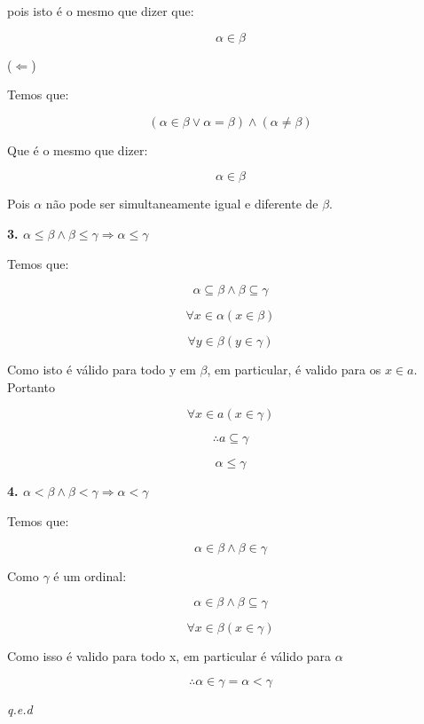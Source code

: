 \documentclass[12pt]{extarticle}
\newcommand{\fim}{\begin{flushright}

   \emph{q.e.d}
\end{flushright}}
\begin{document}
pois isto é o mesmo que dizer que:

$$
\alpha \in \beta
$$

($\Leftarrow$)

Temos que:

$$
(\alpha \in \beta \lor \alpha = \beta) \land (\alpha \neq \beta)
$$

Que é o mesmo que dizer:

$$
\alpha \in \beta
$$

Pois $\alpha$ não pode ser simultaneamente igual e diferente de $\beta$.

\textbf{3. $\alpha \leq \beta \land \beta \leq \gamma \Rightarrow \alpha \leq \gamma$}

Temos que:

$$
\alpha \subseteq \beta \land \beta \subseteq \gamma
$$

$$
\forall x \in \alpha (x \in \beta)
$$

$$
\forall y \in \beta (y \in \gamma)
$$

Como isto é válido para todo y em $\beta$, em particular, é valido para os $x \in a$. Portanto

$$
\forall x \in a (x \in \gamma)
$$

$$
\therefore a \subseteq \gamma
$$

$$
\alpha \leq \gamma
$$

\textbf{4. $\alpha < \beta \land \beta < \gamma \Rightarrow \alpha < \gamma$}

Temos que:

$$
\alpha \in \beta \land \beta \in \gamma
$$

Como $\gamma$ é um ordinal:

$$
\alpha \in \beta \land \beta \subseteq \gamma
$$

$$
\forall x \in \beta (x \in \gamma)
$$

Como isso é valido para todo x, em particular é válido para $\alpha$

$$
\therefore \alpha \in \gamma = \alpha < \gamma
$$

\fim
\end{document}
